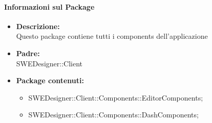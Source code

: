 		\paragraph{Informazioni sul Package}
		\begin{itemize}
			\item \textbf{Descrizione: }\\
			Questo package contiene tutti i components dell'applicazione
			\item \textbf{Padre: }\\ SWEDesigner::Client
			\item \textbf{Package contenuti: }
			\begin{itemize}
				\item SWEDesigner::Client::Components::EditorComponents;
				\item SWEDesigner::Client::Components::DashComponents;
			\end{itemize}
		\end{itemize}

